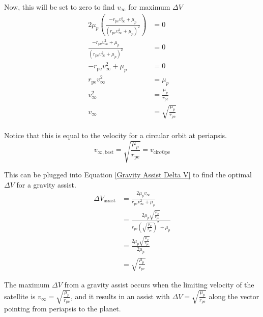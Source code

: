 \documentclass{article}
\begin{document}
Now, this will be set to zero to find $v_\infty$ for maximum $\Delta V$
\begin{align*}
    2\mu_p\left(\frac{-r_\text{pe}v_\infty^2+\mu_p}{(r_\text{pe}v_\infty^2+\mu_p)^2}\right) & = 0                                \\
    \frac{-r_\text{pe}v_\infty^2+\mu_p}{(r_\text{pe}v_\infty^2+\mu_p)^2}                    & = 0                                \\
    -r_\text{pe}v_\infty^2+\mu_p                                                            & = 0                                \\
    r_\text{pe}v_\infty^2                                                                   & = \mu_p                            \\
    v_\infty^2                                                                              & = \frac{\mu_p}{r_\text{pe}}        \\
    v_\infty                                                                                & = \sqrt{\frac{\mu_p}{r_\text{pe}}} \\
\end{align*}

Notice that this is equal to the velocity for a circular orbit at periapsis.
\begin{equation}\label{Gravity Assist Best Vinfty}
    v_{\infty,\text{best}} = \sqrt{\frac{\mu_p}{r_\text{pe}}} = v_\text{circ@pe}
\end{equation}

This can be plugged into Equation \eqref{Gravity Assist Delta V} to find the optimal $\Delta V$ for a gravity assist.
\begin{align*}
    \Delta V_\text{assist} & =\frac{2\mu_p v_\infty}{r_\text{pe}v_\infty^2+\mu_p}                                                              \\
                           & =\frac{2\mu_p \sqrt{\frac{\mu_p}{r_\text{pe}}}}{r_\text{pe}\left(\sqrt{\frac{\mu_p}{r_\text{pe}}}\right)^2+\mu_p} \\
                           & =\frac{2\mu_p \sqrt{\frac{\mu_p}{r_\text{pe}}}}{2\mu_p}                                                           \\
                           & =\sqrt{\frac{\mu_p}{r_\text{pe}}}
\end{align*}

The maximum $\Delta V$ from a gravity assist occurs when the limiting velocity of the satellite is $v_\infty=\sqrt{\frac{\mu_p}{r_\text{pe}}}$, and it results in an assist with $\Delta V = \sqrt{\frac{\mu_p}{r_\text{pe}}}$ along the vector pointing from periapsis to the planet.
\end{document}
